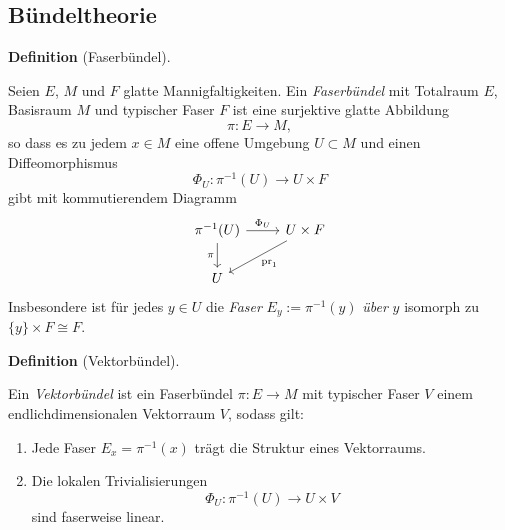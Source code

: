 \documentclass[10pt, letterpaper]{article}
\newcommand{\CustomHeading}[3]{%
  \par\medskip\noindent%
  \textbf{#1 #2} \textnormal{(#3)}.\enskip%
}
\newenvironment{DEF}[2]{\CustomHeading{Definition}{#1}{#2}}{}
\begin{document}
\subsection{Bündeltheorie}

\begin{DEF}{}{Faserbündel}
Seien $E$, $M$ und $F$ glatte Mannigfaltigkeiten. Ein \emph{Faserbündel} mit Totalraum $E$, Basisraum $M$ und typischer Faser $F$ ist eine surjektive glatte Abbildung
\[
\pi:E\to M,
\]
so dass es zu jedem $x\in M$ eine offene Umgebung $U\subset M$ und einen Diffeomorphismus
\[
\Phi_U:\pi^{-1}(U)\to U\times F
\]
gibt mit kommutierendem Diagramm
\[
\begin{tikzcd}
\pi^{-1}(U) \arrow[r,"\Phi_U"] \arrow[d,"\pi"'] & U\times F \arrow[dl,"\operatorname{pr}_1"] \\
U &
\end{tikzcd}
\]
Insbesondere ist für jedes $y\in U$ die \emph{Faser} $E_y:=\pi^{-1}(y)$ \emph{über} $y$ isomorph zu $\{y\}\times F\cong F$.
\end{DEF}

\begin{DEF}{}{Vektorbündel}
Ein \emph{Vektorbündel} ist ein Faserbündel $\pi:E\to M$ mit typischer Faser $V$ einem endlichdimensionalen Vektorraum $V$, sodass gilt:
\begin{enumerate}
  \item Jede Faser $E_x=\pi^{-1}(x)$ trägt die Struktur eines Vektorraums.
  \item Die lokalen Trivialisierungen
        \[
        \Phi_U:\pi^{-1}(U)\to U\times V
        \]
        sind faserweise linear.
\end{enumerate}
\end{DEF}
\end{document}
